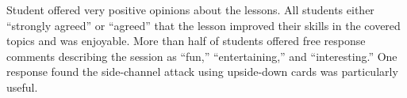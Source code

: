 Student offered very positive opinions about the lessons.
All students
either ``strongly agreed'' or ``agreed''
that the lesson improved their skills in the covered topics
and was enjoyable.
More than half of students offered free response comments describing the
session as ``fun,'' ``entertaining,'' and ``interesting.''  One response
found the side-channel attack using upside-down cards
was particularly useful.





%
%


